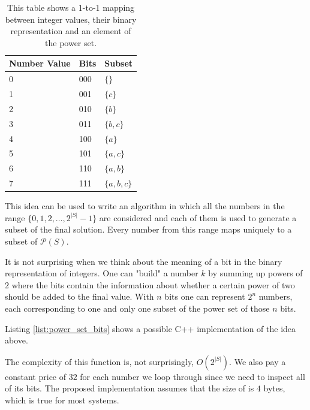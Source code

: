 \begin{table}
    \centering
    \begin{tabular}{|l|l|l|}
        \hline
        Number Value & Bits & Subset\\ \hline
        0     & 000  & $\{\}$\\ \hline
        1     & 001  & $\{c\}$\\ \hline
        2     & 010  & $\{b\}$\\ \hline
        3     & 011  & $\{b,c\}$\\ \hline
        4     & 100  & $\{a\}$\\ \hline
        5     & 101  & $\{a,c\}$\\ \hline
        6     & 110  & $\{a,b\}$\\ \hline
        7     & 111  & $\{a,b,c\}$ \\ \hline
    \end{tabular}
    \caption[Mapping between bits and element of the power set.]{This table shows a 1-to-1 mapping between integer values, their binary representation and an element of the power set.}
    \label{tab:mapping_value_bits}
\end{table}


This idea can be used to write an algorithm in which all the numbers in the range $\{0,1,2,\ldots,
2^{|S|}-1\}$ are considered and each of them is used to generate a subset of the final solution.
Every number from this range maps uniquely to a subset of $\mathcal{P}(S)$. 

It is not
surprising when we think about the meaning of a bit in the binary representation of integers. One
can "build" a number $k$ by summing up powers of $2$ where the bits contain the information about whether a
certain power of two should be added to the final value. With $n$
bits one can represent $2^n$ numbers, each corresponding to one and only one subset of the power set of those $n$ bits.


Listing \ref{list:power_set_bits} shows  a possible C++ implementation of the idea above.






The complexity of this function is, not surprisingly, $O(2^{|S|})$. 
We also pay a constant price of $32$ for each number we loop through since we need to inspect all of its bits.
The proposed implementation assumes that the size of  is $4$ bytes, 
which is true for most systems.

